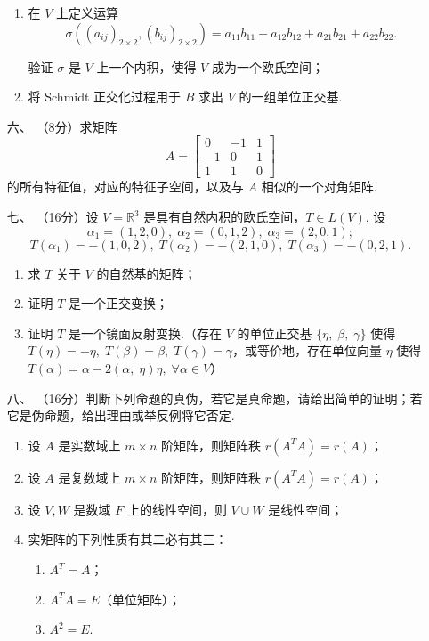 \begin{enumerate}
\begin{enumerate}[label=(\arabic*)]
        \item 在 $V$ 上定义运算
        \[\sigma\left(\left(a_{ij}\right)_{2 \times 2},\left(b_{ij}\right)_{2 \times 2}\right)=a_{11} b_{11}+a_{12} b_{12}+a_{21} b_{21}+a_{22} b_{22}.\]

        验证 $\sigma$ 是 $V$ 上一个内积，使得 $V$ 成为一个欧氏空间；

        \item 将 Schmidt 正交化过程用于 $B$ 求出 $V$ 的一组单位正交基.
    \end{enumerate}
	\item[六、]（8分）求矩阵
	\[A=\begin{bmatrix}
    0 & -1 & 1 \\
    -1 & 0 & 1 \\
    1 & 1 & 0
    \end{bmatrix}\]
    的所有特征值，对应的特征子空间，以及与 $A$ 相似的一个对角矩阵.
	\item[七、]（16分）设 $V=\mathbb{R}^3$ 是具有自然内积的欧氏空间，$T \in L(V)$. 设
	\[\alpha_1=(1,2,0), \;\alpha_2=(0,1,2), \;\alpha_3=(2,0,1);\]
    \[T\left(\alpha_1\right)=-(1,0,2), \;T\left(\alpha_2\right)=-(2,1,0), \;T\left(\alpha_3\right)=-(0,2,1).\]
    \begin{enumerate}[label=(\arabic*)]
        \item 求 $T$ 关于 $V$ 的自然基的矩阵；

        \item 证明 $T$ 是一个正交变换；

        \item 证明 $T$ 是一个镜面反射变换.（存在 $V$ 的单位正交基 $\{\eta,\; \beta,\; \gamma\}$ 使得 $T(\eta)=-\eta,\; T(\beta)=\beta,\; T(\gamma)=\gamma$，或等价地，存在单位向量 $\eta$ 使得 $T(\alpha)=\alpha-2(\alpha,\; \eta) \eta,\; \forall \alpha \in V$）
    \end{enumerate}
	\item[八、]（16分）判断下列命题的真伪，若它是真命题，请给出简单的证明；若它是伪命题，给出理由或举反例将它否定.
    \begin{enumerate}[label=(\arabic*)]
        \item 设 $A$ 是实数域上 $m \times n$ 阶矩阵，则矩阵秩 $r\left(A^T A\right)=r(A)$；

        \item 设 $A$ 是复数域上 $m \times n$ 阶矩阵，则矩阵秩 $r\left(A^T A\right)=r(A)$；

        \item 设 $V, W$ 是数域 $F$ 上的线性空间，则 $V \cup W$ 是线性空间；

        \item 实矩阵的下列性质有其二必有其三：
        \begin{enumerate}
            \item $A^T=A$；

            \item $A^T A=E$（单位矩阵）；

            \item $A^2=E$.
        \end{enumerate}
    \end{enumerate}
\end{enumerate}

\clearpage
